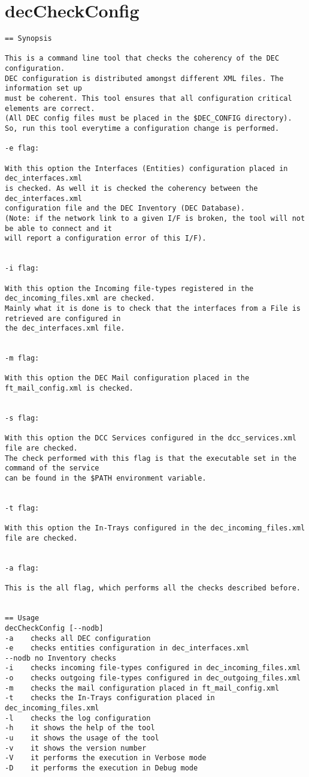 \documentclass[dec_sum_main.tex]{subfiles}
\begin{document}
\section{decCheckConfig}
 
\begin{verbatim}
== Synopsis

This is a command line tool that checks the coherency of the DEC configuration.
DEC configuration is distributed amongst different XML files. The information set up
must be coherent. This tool ensures that all configuration critical elements are correct.
(All DEC config files must be placed in the $DEC_CONFIG directory). 
So, run this tool everytime a configuration change is performed.

-e flag:

With this option the Interfaces (Entities) configuration placed in dec_interfaces.xml
is checked. As well it is checked the coherency between the dec_interfaces.xml
configuration file and the DEC Inventory (DEC Database).
(Note: if the network link to a given I/F is broken, the tool will not be able to connect and it
will report a configuration error of this I/F).


-i flag:

With this option the Incoming file-types registered in the dec_incoming_files.xml are checked.
Mainly what it is done is to check that the interfaces from a File is retrieved are configured in 
the dec_interfaces.xml file.


-m flag:

With this option the DEC Mail configuration placed in the ft_mail_config.xml is checked.


-s flag:

With this option the DCC Services configured in the dcc_services.xml file are checked.
The check performed with this flag is that the executable set in the command of the service
can be found in the $PATH environment variable.


-t flag:

With this option the In-Trays configured in the dec_incoming_files.xml file are checked.


-a flag:

This is the all flag, which performs all the checks described before.


== Usage
decCheckConfig [--nodb]
-a    checks all DEC configuration
-e    checks entities configuration in dec_interfaces.xml
--nodb no Inventory checks
-i    checks incoming file-types configured in dec_incoming_files.xml
-o    checks outgoing file-types configured in dec_outgoing_files.xml
-m    checks the mail configuration placed in ft_mail_config.xml
-t    checks the In-Trays configuration placed in dec_incoming_files.xml
-l    checks the log configuration
-h    it shows the help of the tool
-u    it shows the usage of the tool
-v    it shows the version number
-V    it performs the execution in Verbose mode
-D    it performs the execution in Debug mode     

\end{verbatim}
\end{document}
